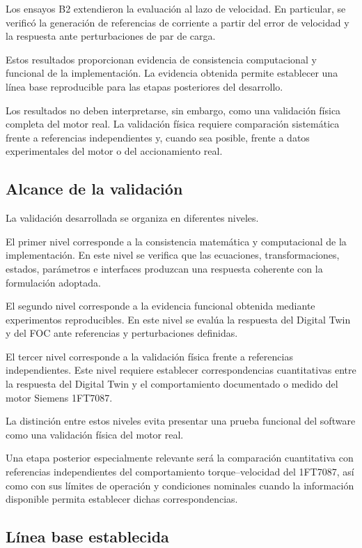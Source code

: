 Los ensayos B2 extendieron la evaluación al lazo de velocidad. En particular, se verificó la generación de referencias de corriente a partir del error de velocidad y la respuesta ante perturbaciones de par de carga.

Estos resultados proporcionan evidencia de consistencia computacional y funcional de la implementación. La evidencia obtenida permite establecer una línea base reproducible para las etapas posteriores del desarrollo.

Los resultados no deben interpretarse, sin embargo, como una validación física completa del motor real. La validación física requiere comparación sistemática frente a referencias independientes y, cuando sea posible, frente a datos experimentales del motor o del accionamiento real.

\subsection{Alcance de la validación}

La validación desarrollada se organiza en diferentes niveles.

El primer nivel corresponde a la consistencia matemática y computacional de la implementación. En este nivel se verifica que las ecuaciones, transformaciones, estados, parámetros e interfaces produzcan una respuesta coherente con la formulación adoptada.

El segundo nivel corresponde a la evidencia funcional obtenida mediante experimentos reproducibles. En este nivel se evalúa la respuesta del Digital Twin y del FOC ante referencias y perturbaciones definidas.

El tercer nivel corresponde a la validación física frente a referencias independientes. Este nivel requiere establecer correspondencias cuantitativas entre la respuesta del Digital Twin y el comportamiento documentado o medido del motor Siemens 1FT7087.

La distinción entre estos niveles evita presentar una prueba funcional del software como una validación física del motor real.

Una etapa posterior especialmente relevante será la comparación cuantitativa con referencias independientes del comportamiento torque--velocidad del 1FT7087, así como con sus límites de operación y condiciones nominales cuando la información disponible permita establecer dichas correspondencias.

\subsection{Línea base establecida}

